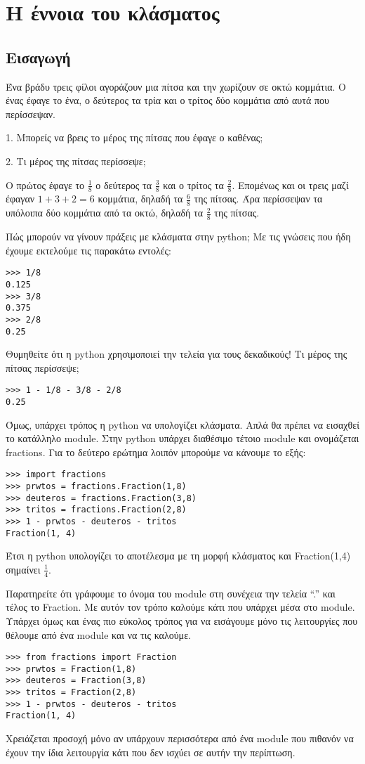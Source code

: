 \chapter{Η έννοια του κλάσματος}
\section{Εισαγωγή}
\begin{exercise}
Ένα βράδυ τρεις φίλοι αγοράζουν μια πίτσα και την χωρίζουν σε οκτώ κομμάτια. Ο ένας έφαγε το ένα, ο δεύτερος τα τρία και ο τρίτος δύο κομμάτια από αυτά που περίσσεψαν.

1. Μπορείς να βρεις το μέρος της πίτσας που έφαγε ο καθένας;

 2. Τι μέρος της πίτσας περίσσεψε;
 \end{exercise}

Ο πρώτος έφαγε το $\frac{1}{8}$ ο δεύτερος τα $\frac{3}{8}$ και ο τρίτος τα $\frac{2}{8}$.
Επομένως και οι τρεις μαζί έφαγαν $1+3+2=6$ κομμάτια, δηλαδή τα $\frac{6}{8}$ της πίτσας. Άρα περίσσεψαν τα υπόλοιπα δύο κομμάτια από τα οκτώ, δηλαδή τα $\frac{2}{8}$ της πίτσας.

Πώς μπορούν να γίνουν πράξεις με κλάσματα στην python; Με τις γνώσεις που ήδη έχουμε εκτελούμε τις παρακάτω εντολές:
\begin{lstlisting}
>>> 1/8
0.125
>>> 3/8
0.375
>>> 2/8
0.25
\end{lstlisting}
Θυμηθείτε ότι η python χρησιμοποιεί την τελεία για τους δεκαδικούς!
Τι μέρος της πίτσας περίσσεψε;
\begin{lstlisting}
>>> 1 - 1/8 - 3/8 - 2/8
0.25
\end{lstlisting}

Όμως, υπάρχει τρόπος η python να υπολογίζει κλάσματα. Απλά θα πρέπει να εισαχθεί το κατάλληλο module. Στην python υπάρχει διαθέσιμο τέτοιο module και ονομάζεται fractions. Για το δεύτερο ερώτημα λοιπόν μπορούμε να κάνουμε το εξής:
\begin{lstlisting}
>>> import fractions
>>> prwtos = fractions.Fraction(1,8)
>>> deuteros = fractions.Fraction(3,8)
>>> tritos = fractions.Fraction(2,8)
>>> 1 - prwtos - deuteros - tritos
Fraction(1, 4)
\end{lstlisting}
Έτσι η python υπολογίζει το αποτέλεσμα με τη μορφή κλάσματος και Fraction(1,4) σημαίνει $\frac{1}{4}$.

Παρατηρείτε ότι γράφουμε το όνομα του module στη συνέχεια την τελεία ``.'' και τέλος το Fraction. Με αυτόν τον τρόπο καλούμε κάτι που υπάρχει μέσα στο module. Υπάρχει όμως και ένας πιο εύκολος τρόπος για να εισάγουμε μόνο τις λειτουργίες που θέλουμε από ένα module και να τις καλούμε.
\begin{lstlisting}
>>> from fractions import Fraction
>>> prwtos = Fraction(1,8)
>>> deuteros = Fraction(3,8)
>>> tritos = Fraction(2,8)
>>> 1 - prwtos - deuteros - tritos
Fraction(1, 4)
\end{lstlisting}
Χρειάζεται προσοχή μόνο αν υπάρχουν περισσότερα από ένα module που πιθανόν να έχουν την ίδια λειτουργία κάτι που δεν ισχύει σε αυτήν την περίπτωση. 

